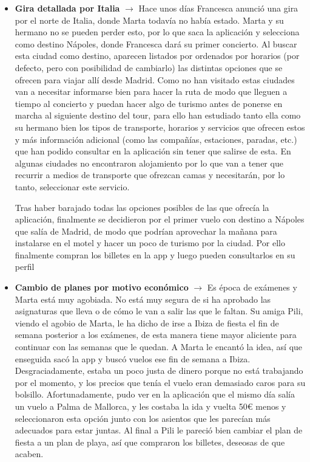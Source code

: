 \begin{itemize}
    \item \textbf{Gira detallada por Italia} $\rightarrow$ Hace unos días Francesca anunció una gira por el norte de Italia, donde Marta todavía no había estado. Marta y su hermano no se pueden perder esto, por lo que saca la aplicación y selecciona como destino Nápoles, donde Francesca dará su primer concierto. Al buscar esta ciudad como destino, aparecen listados por ordenados por horarios (por defecto, pero con posibilidad de cambiarlo) las distintas opciones que se ofrecen para viajar allí desde Madrid. Como no han visitado estas ciudades van a necesitar informarse bien para hacer la ruta de modo que lleguen a tiempo al concierto y puedan hacer algo de turismo antes de ponerse en marcha al siguiente destino del tour, para ello han estudiado tanto ella como su hermano bien los tipos de transporte, horarios y servicios que ofrecen estos y más información adicional (como las compañías, estaciones, paradas, etc.) que han podido consultar en la aplicación sin tener que salirse de esta. En algunas ciudades no encontraron alojamiento por lo que van a tener que recurrir a medios de transporte que ofrezcan camas y necesitarán, por lo tanto, seleccionar este servicio.

    Tras haber barajado todas las opciones posibles de las que ofrecía la aplicación, finalmente se decidieron por el primer vuelo con destino a Nápoles que salía de Madrid, de modo que podrían aprovechar la mañana para instalarse en el motel y hacer un poco de turismo por la ciudad. Por ello finalmente compran los billetes en la app y luego pueden consultarlos en su perfil    
    
    \item \textbf{Cambio de planes por motivo económico} $\rightarrow$ Es época de exámenes y Marta está muy agobiada. No está muy segura de si ha aprobado las asignaturas que lleva o de cómo le van a salir las que le faltan. Su amiga Pili, viendo el agobio de Marta, le ha dicho de irse a Ibiza de fiesta el fin de semana posterior a los exámenes, de esta manera tiene mayor aliciente para continuar con las semanas que le quedan. A Marta le encantó la idea, así que enseguida sacó la app y buscó vuelos ese fin de semana a Ibiza. Desgraciadamente, estaba un poco justa de dinero porque no está trabajando por el momento, y los precios que tenía el vuelo eran demasiado caros para su bolsillo. Afortunadamente, pudo ver en la aplicación que el mismo día salía un vuelo a Palma de Mallorca, y les costaba la ida y vuelta 50€ menos y seleccionaron esta opción junto con los asientos que les parecían más adecuados para estar juntas. Al final a Pili le pareció bien cambiar el plan de fiesta a un plan de playa, así que compraron los billetes, deseosas de que acaben.
\end{itemize}
